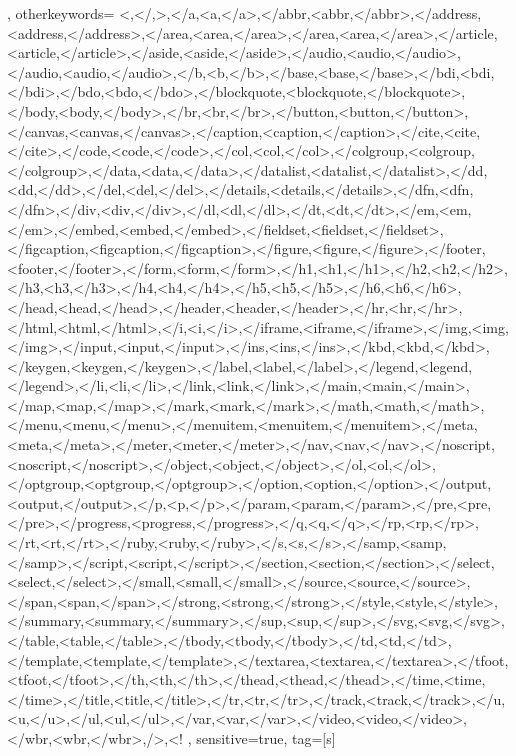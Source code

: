 {{	},
	otherkeywords={
		<,</,>,</a,<a,</a>,</abbr,<abbr,</abbr>,</address,<address,</address>,</area,<area,</area>,</area,<area,</area>,</article,<article,</article>,</aside,<aside,</aside>,</audio,<audio,</audio>,</audio,<audio,</audio>,</b,<b,</b>,</base,<base,</base>,</bdi,<bdi,</bdi>,</bdo,<bdo,</bdo>,</blockquote,<blockquote,</blockquote>,</body,<body,</body>,</br,<br,</br>,</button,<button,</button>,</canvas,<canvas,</canvas>,</caption,<caption,</caption>,</cite,<cite,</cite>,</code,<code,</code>,</col,<col,</col>,</colgroup,<colgroup,</colgroup>,</data,<data,</data>,</datalist,<datalist,</datalist>,</dd,<dd,</dd>,</del,<del,</del>,</details,<details,</details>,</dfn,<dfn,</dfn>,</div,<div,</div>,</dl,<dl,</dl>,</dt,<dt,</dt>,</em,<em,</em>,</embed,<embed,</embed>,</fieldset,<fieldset,</fieldset>,</figcaption,<figcaption,</figcaption>,</figure,<figure,</figure>,</footer,<footer,</footer>,</form,<form,</form>,</h1,<h1,</h1>,</h2,<h2,</h2>,</h3,<h3,</h3>,</h4,<h4,</h4>,</h5,<h5,</h5>,</h6,<h6,</h6>,</head,<head,</head>,</header,<header,</header>,</hr,<hr,</hr>,</html,<html,</html>,</i,<i,</i>,</iframe,<iframe,</iframe>,</img,<img,</img>,</input,<input,</input>,</ins,<ins,</ins>,</kbd,<kbd,</kbd>,</keygen,<keygen,</keygen>,</label,<label,</label>,</legend,<legend,</legend>,</li,<li,</li>,</link,<link,</link>,</main,<main,</main>,</map,<map,</map>,</mark,<mark,</mark>,</math,<math,</math>,</menu,<menu,</menu>,</menuitem,<menuitem,</menuitem>,</meta,<meta,</meta>,</meter,<meter,</meter>,</nav,<nav,</nav>,</noscript,<noscript,</noscript>,</object,<object,</object>,</ol,<ol,</ol>,</optgroup,<optgroup,</optgroup>,</option,<option,</option>,</output,<output,</output>,</p,<p,</p>,</param,<param,</param>,</pre,<pre,</pre>,</progress,<progress,</progress>,</q,<q,</q>,</rp,<rp,</rp>,</rt,<rt,</rt>,</ruby,<ruby,</ruby>,</s,<s,</s>,</samp,<samp,</samp>,</script,<script,</script>,</section,<section,</section>,</select,<select,</select>,</small,<small,</small>,</source,<source,</source>,</span,<span,</span>,</strong,<strong,</strong>,</style,<style,</style>,</summary,<summary,</summary>,</sup,<sup,</sup>,</svg,<svg,</svg>,</table,<table,</table>,</tbody,<tbody,</tbody>,</td,<td,</td>,</template,<template,</template>,</textarea,<textarea,</textarea>,</tfoot,<tfoot,</tfoot>,</th,<th,</th>,</thead,<thead,</thead>,</time,<time,</time>,</title,<title,</title>,</tr,<tr,</tr>,</track,<track,</track>,</u,<u,</u>,</ul,<ul,</ul>,</var,<var,</var>,</video,<video,</video>,</wbr,<wbr,</wbr>,/>,<!
	},
	sensitive=true,
	tag=[s]
}

